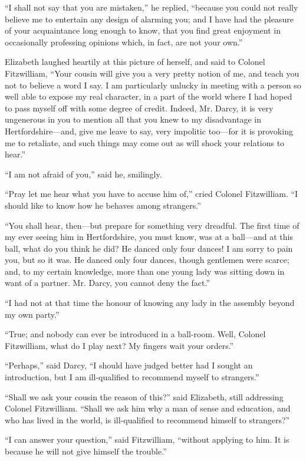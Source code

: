 \documentclass[12pt]{book}
\begin{document}
``I shall not say that you are mistaken,'' he replied, ``because you could not really believe me to entertain any design of alarming you; and I have had the pleasure of your acquaintance long enough to know, that you find great enjoyment in occasionally professing opinions which, in fact, are not your own.''

Elizabeth laughed heartily at this picture of herself, and said to Colonel Fitzwilliam, ``Your cousin will give you a very pretty notion of me, and teach you not to believe a word I say. I am particularly unlucky in meeting with a person so well able to expose my real character, in a part of the world where I had hoped to pass myself off with some degree of credit. Indeed, Mr. Darcy, it is very ungenerous in you to mention all that you knew to my disadvantage in Hertfordshire---and, give me leave to say, very impolitic too---for it is provoking me to retaliate, and such things may come out as will shock your relations to hear.''

``I am not afraid of you,'' said he, smilingly.

``Pray let me hear what you have to accuse him of,'' cried Colonel Fitzwilliam. ``I should like to know how he behaves among strangers.''

``You shall hear, then---but prepare for something very dreadful. The first time of my ever seeing him in Hertfordshire, you must know, was at a ball---and at this ball, what do you think he did? He danced only four dances! I am sorry to pain you, but so it was. He danced only four dances, though gentlemen were scarce; and, to my certain knowledge, more than one young lady was sitting down in want of a partner. Mr. Darcy, you cannot deny the fact.''

``I had not at that time the honour of knowing any lady in the assembly beyond my own party.''

``True; and nobody can ever be introduced in a ball-room. Well, Colonel Fitzwilliam, what do I play next? My fingers wait your orders.''

``Perhaps,'' said Darcy, ``I should have judged better had I sought an introduction, but I am ill-qualified to recommend myself to strangers.''

``Shall we ask your cousin the reason of this?'' said Elizabeth, still addressing Colonel Fitzwilliam. ``Shall we ask him why a man of sense and education, and who has lived in the world, is ill-qualified to recommend himself to strangers?''

``I can answer your question,'' said Fitzwilliam, ``without applying to him. It is because he will not give himself the trouble.''
\end{document}
